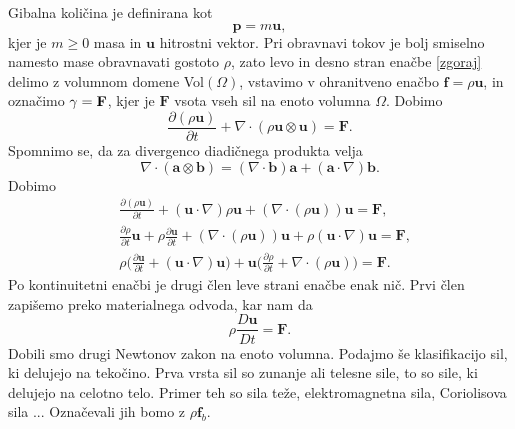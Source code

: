\documentclass[mat2, tisk]{fmfdelo}
\newcommand{\bd}{\textbf}
\begin{document}
Gibalna količina je definirana kot
\begin{equation}
\bd{p} = m \bd{u},
\label{zgoraj}
\end{equation}
kjer je $m\geq 0$ masa in $\bd{u}$ hitrostni vektor. Pri obravnavi tokov 
je bolj smiselno namesto mase obravnavati gostoto $\rho$, zato levo in desno stran enačbe \ref{zgoraj} delimo z volumnom domene Vol$(\Omega)$,
vstavimo v ohranitveno enačbo $\bd{f} = \rho\bd{u}$, in označimo $\bd{\text{$\gamma$}} = \bd{F}$, kjer je $\bd{F}$ vsota vseh sil na enoto volumna $\Omega$. Dobimo
\begin{equation*}
\frac{\partial (\rho \bd{u})}{\partial t} + \nabla \cdot (\rho \bd{u} \otimes \bd{u}) = \bd{F}.
\end{equation*}
Spomnimo se, da za divergenco diadičnega produkta velja
\begin{equation*}
\nabla \cdot (\bd{a} \otimes \bd{b}) = (\nabla \cdot \bd{b}) \bd{a} + (\bd{a} \cdot \nabla) \bd{b}.
\end{equation*}
Dobimo 
\begin{align*}
&\frac{\partial (\rho \bd{u})}{\partial t} + (\bd{u} \cdot \nabla) \rho \bd{u} + (\nabla \cdot (\rho \bd{u})) \bd{u} = \bd{F}, \\
&\frac{\partial \rho}{\partial t} \bd{u} + \rho\frac{\partial \bd{u}}{\partial t} + (\nabla \cdot (\rho\bd{u})) \bd{u} + \rho(\bd{u} \cdot \nabla) \bd{u} = \bd{F}, \\
&\rho \Big(\frac{\partial \bd{u}}{\partial t} + (\bd{u} \cdot \nabla) \bd{u}\Big) + \bd{u} \Big(\frac{\partial \rho}{\partial t} + \nabla \cdot (\rho\bd{u}) \Big) = \bd{F}.
\end{align*}
Po kontinuitetni enačbi je drugi člen leve strani enačbe enak nič. Prvi člen zapišemo preko 
materialnega odvoda, kar nam da 
\begin{equation*}
\rho \frac{D \bd{u}}{D t} = \bd{F}.
\end{equation*}
Dobili smo drugi Newtonov zakon na enoto volumna.
Podajmo še klasifikacijo sil, ki delujejo na tekočino. Prva vrsta sil so zunanje ali telesne sile, 
to so sile, ki delujejo na celotno telo. Primer teh so sila teže, elektromagnetna sila, 
Coriolisova sila ... Označevali jih bomo z $\rho \bd{f}_b$. 
\end{document}
